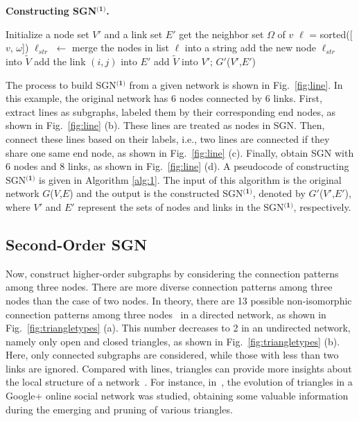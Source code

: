 \documentclass[10pt,journal,compsoc]{IEEEtran}
\begin{document}
\begin{algorithm}[!t]
\caption{\textbf{Constructing SGN$^{\textbf{(1)}}$.}}
\label{alg:1}
Initialize a node set $V'$ and a link set $E'$\;
{
    get the neighbor set $\Omega$ of $v$\;
          {$\ell$ = sorted([$v$, $\omega$])\;
          $\ell_{str}$ $\leftarrow$ merge the nodes in list $\ell$ into a string\;
          add the new node $\ell_{str}$ into $\widetilde{V}$\;}
          {add the link $(i,j)$ into $E'$\;}
    add $\widetilde{V}$ into $V'$;
}
\Return $G'$($V'$,$E'$)\;
\end{algorithm}

The process to build SGN$^{\textbf{(1)}}$ from a given network is shown in Fig.~\ref{fig:line}. In this example, the original network has 6 nodes connected by 6 links. First, extract lines as subgraphs, labeled them by their corresponding end nodes, as shown in Fig.~\ref{fig:line} (b). These lines are treated as nodes in SGN. Then, connect these lines based on their labels, i.e., two lines are connected if they share one same end node, as shown in Fig.~\ref{fig:line} (c). Finally, obtain SGN with 6 nodes and 8 links, as shown in Fig.~\ref{fig:line} (d). A pseudocode of constructing SGN$^{\textbf{(1)}}$ is given in Algorithm \ref{alg:1}. The input of this algorithm is the original network $G$($V$,$E$) and the output is the constructed SGN$^{\textbf{(1)}}$, denoted by $G'$($V'$,$E'$), where $V'$ and $E'$ represent the sets of nodes and links in the SGN$^{\textbf{(1)}}$, respectively.

\subsection{Second-Order SGN}
Now, construct higher-order subgraphs by considering the connection patterns among three nodes. There are more diverse connection patterns among three nodes than the case of two nodes. In theory, there are 13 possible non-isomorphic connection patterns among three nodes~\cite{wernicke2006efficient} in a directed network, as shown in Fig.~\ref{fig:triangletypes} (a). This number decreases to 2 in an undirected network, namely only open and closed triangles, as shown in Fig.~\ref{fig:triangletypes} (b). Here, only connected subgraphs are considered, while those with less than two links are ignored. Compared with lines, triangles can provide more insights about the local structure of a network~\cite{eckmann2002curvature}. For instance, in~\cite{schioberg2015evolution}, the evolution of triangles in a Google+ online social network was studied, obtaining some valuable information during the emerging and pruning of various triangles.
\end{document}
